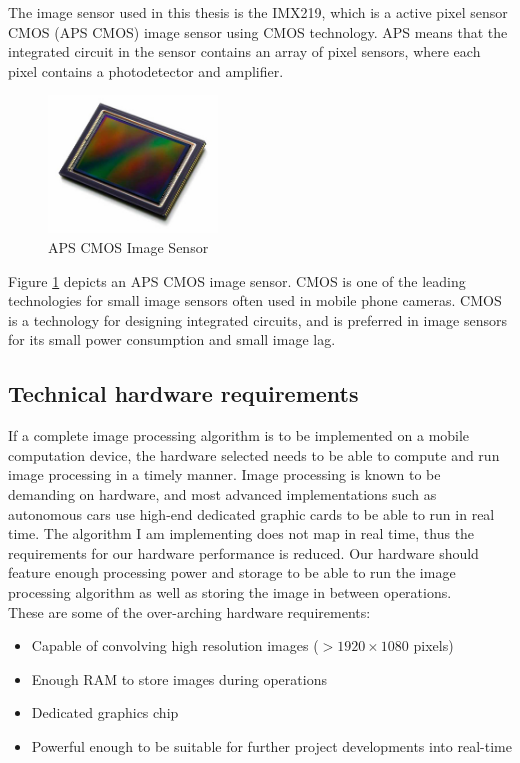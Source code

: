 The image sensor used in this thesis is the IMX219, which is a active pixel sensor CMOS (APS CMOS) image sensor using CMOS technology. APS means that the integrated circuit in the sensor contains an array of pixel sensors, where each pixel contains a photodetector and amplifier.

\begin{figure}[h]
  \centering
  \includegraphics[width=0.4\textwidth]{fig/cmos}
  \caption{APS CMOS Image Sensor}
  \label{fig:cmos}
\end{figure}

Figure \ref{fig:cmos} depicts an APS CMOS image sensor. CMOS is one of the leading technologies for small image sensors often used in mobile phone cameras. CMOS is a technology for designing integrated circuits, and is preferred in image sensors for its small power consumption and small image lag. \\





\newpage
\subsection{Technical hardware requirements}
If a complete image processing algorithm is to be implemented on a mobile computation device, the hardware selected needs to be able to compute and run image processing in a timely manner. Image processing is known to be demanding on hardware, and most advanced implementations such as autonomous cars use high-end dedicated graphic cards \cite{tesla} to be able to run in real time. The algorithm I am implementing does not map in real time, thus the requirements for our hardware performance is reduced. Our hardware should feature enough processing power and storage to be able to run the image processing algorithm as well as storing the image in between operations.\\

These are some of the over-arching hardware requirements:
\begin{itemize}
\item Capable of convolving high resolution images ($>1920\times1080$ pixels)
\item Enough RAM to store images during operations
\item Dedicated graphics chip
\item Powerful enough to be suitable for further project developments into real-time
\end{itemize}

